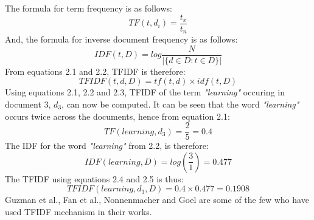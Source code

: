\documentclass[a4paper,12pt,twoside]{report}
\begin{document}
\newline \newline
The formula for term frequency is as follows:
\newline
\begin{equation}
\label{eq:tfidf1}
    TF(t, d_i) = \frac{t_x}{t_n}
\end{equation}
\newline
And, the formula for inverse document frequency is as follows:
\newline
\begin{equation}
\label{eq:tfidf2}
    IDF(t, D) = log\frac{N}{|\{d \in D : t \in D\}|}
\end{equation}
\newline
From equations 2.1 and 2.2, \acs{TFIDF} is therefore:
\newline
\begin{equation}
\label{eq:tfidf3}
    TFIDF(t, d, D) = tf(t, d)\times idf(t, D)
\end{equation}
\newline
Using equations 2.1, 2.2 and 2.3, \acs{TFIDF} of the term  \textit{"learning"} occuring in document 3, $d_3$, can now be computed. It can be seen that the word \textit{"learning"} occurs twice across the documents, hence from equation 2.1:
\newline
\begin{equation}
\label{eq:tfidf4}
    TF(learning, d_3) = \frac{2}{5} = 0.4
\end{equation}
\newline
The IDF for the word \textit{"learning"} from 2.2, is therefore:
\newline
\begin{equation}
\label{eq:tfidf5}
    IDF(learning, D) = log(\frac{3}{1}) = 0.477
\end{equation}
\newline
The \acs{TFIDF} using equations 2.4 and 2.5 is thus:
\newline
\begin{equation}
\label{eq:tfidf6}
    TFIDF(learning, d_3, D) = 0.4\times0.477 = 0.1908
\end{equation}
\newline 
Guzman et al.\cite{Guzman2017}, Fan et al.\cite{Fan2017}, Nonnenmacher\cite{Nonnenmacher2017} and Goel \cite{Goel2017} are some of the few who have used \acs{TFIDF} mechanism in their works.
  
\end{document}
